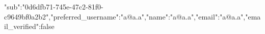 {"sub":"0d6dfb71-745e-47c2-81f0-c9649bf0a2b2","preferred_username":"a@a.a","name":"a@a.a","email":"a@a.a","email_verified":false}